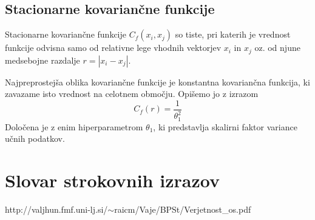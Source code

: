 \documentclass[12pt,a4paper]{amsart}
\theoremstyle{definition} %
\theoremstyle{plain} %
\newcommand{\geslo}[2]{\noindent\textbf{#1}\hspace*{3mm}\hangindent=\parindent\hangafter=1 #2}
\begin{document}
\subsection{Stacionarne kovariančne funkcije}
 
Stacionarne kovariančne funkcije $C_{f}(x_{i}, x_{j})$ so tiste, pri katerih je vrednost funkcije odvisna samo od relativne lege vhodnih vektorjev $x_{i}$ in $x_{j}$ oz. od njune medsebojne razdalje $ r= | x_{i} - x_{j} |$. 

Najpreprostejša oblika kovariančne funkcije je konstantna kovariančna funkcija, ki zavazame isto vrednost na celotnem območju. Opišemo jo z izrazom
\begin{equation}
C_{f}(r) = \frac{1}{\theta_{1}^2}
\end{equation}
Določena je z enim hiperparametrom $\theta_{1}$, ki predstavlja skalirni faktor variance učnih podatkov.


\section*{Slovar strokovnih izrazov}

%
%


\begin{thebibliography}{99}

\bibitem{}http://valjhun.fmf.uni-lj.si/$\sim$raicm/Vaje/BPSt/Verjetnost\_os.pdf

\end{thebibliography}
\end{document}

